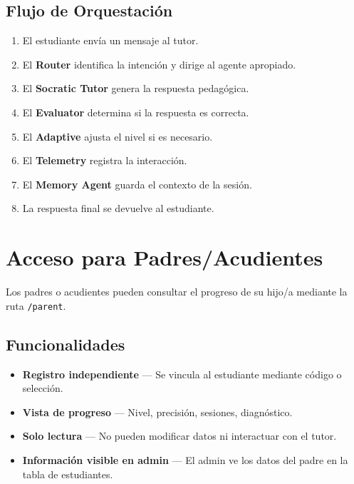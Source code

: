 \documentclass[12pt, a4paper, oneside]{book}
\begin{document}
\section{Flujo de Orquestación}

\begin{enumerate}
    \item El estudiante envía un mensaje al tutor.
    \item El \textbf{Router} identifica la intención y dirige al agente apropiado.
    \item El \textbf{Socratic Tutor} genera la respuesta pedagógica.
    \item El \textbf{Evaluator} determina si la respuesta es correcta.
    \item El \textbf{Adaptive} ajusta el nivel si es necesario.
    \item El \textbf{Telemetry} registra la interacción.
    \item El \textbf{Memory Agent} guarda el contexto de la sesión.
    \item La respuesta final se devuelve al estudiante.
\end{enumerate}


\chapter{Acceso para Padres/Acudientes}

Los padres o acudientes pueden consultar el progreso de su hijo/a mediante la ruta \texttt{/parent}.

\section{Funcionalidades}

\begin{itemize}
    \item \textbf{Registro independiente} — Se vincula al estudiante mediante código o selección.
    \item \textbf{Vista de progreso} — Nivel, precisión, sesiones, diagnóstico.
    \item \textbf{Solo lectura} — No pueden modificar datos ni interactuar con el tutor.
    \item \textbf{Información visible en admin} — El admin ve los datos del padre en la tabla de estudiantes.
\end{itemize}
\end{document}
